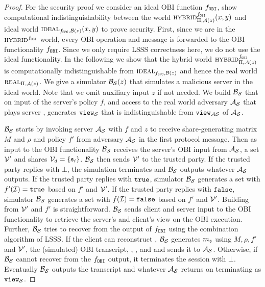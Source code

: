 \begin{proof}
For the security proof we consider an ideal \ac{OBI} function $f_\mathtt{OBI}$, \ie show computational indistinguishability between the world $\HYBRID^{f_\OBI}_{\Pi, \cA(z)} (x, y)$ and ideal world $\IDEAL_{f_\SPC, \cB(z)}(x, y)$ to prove security. 
First, since we are in the $\HYBRID^{f_\OBI}$ world, every \ac{OBI} operation and message is forwarded to the \ac{OBI} functionality $f_\mathtt{OBI}$.
Since we only require \ac{LSSS} correctness here, we do not use the ideal functionality.
In the following we show that the hybrid world $\HYBRID^{f_\OBI}_{\Pi, \cA(z)}$ is computationally indistinguishable from $\IDEAL_{f_\SPC, \cB(z)}$ and hence the real world $\REAL_{\Pi, \cA(z)}$. 
We give a simulator $\mathcal{B}_\mathcal{S}(z)$ that simulates a malicious server in the ideal world. 
Note that we omit auxiliary input $z$ if not needed. 
We build $\mathcal{B}_\mathcal{S}$ that on input of the server's policy $f$, and access to the real world adversary $\mathcal{A}_\mathcal{S}$ that plays server \Server, generates $\mathtt{view}_\mathcal{S}$ that is indistinguishable from $\mathtt{view}_{\mathcal{A}\mathcal{S}}$ of $\mathcal{A}_\mathcal{S}$.

$\mathcal{B}_\mathcal{S}$ starts by invoking server $\mathcal{A}_\mathcal{S}$ with $f$ and $z$ to receive share-generating matrix $M$ and $\rho$ and policy $f'$ from adversary $\mathcal{A}_\mathcal{S}$ in the first protocol message. 
Then as input to the \ac{OBI} functionality $\mathcal{B}_\mathcal{S}$ receives the server's \ac{OBI} input  from $\mathcal{A}_\mathcal{S}$, \ie a set $\mathcal{V}'$ and shares $\mathcal{V}_d=\{\mathfrak{s}_i\}$. 
$\mathcal{B}_\mathcal{S}$ then sends $\mathcal{V}'$ to the trusted party. 
If the trusted party replies with $\bot$, the simulation terminates and $\mathcal{B}_\mathcal{S}$ outputs whatever $\mathcal{A}_\mathcal{S}$ outputs. 
If the trusted party replies with $\mathtt{true}$, 
simulator $\mathcal{B}_\mathcal{S}$ generates a set \ClientSet with $f'(\mathcal{I})=\mathtt{true}$ based on $f'$ and $\mathcal{V}'$. 
If the trusted party replies with $\texttt{false}$, simulator $\mathcal{B}_\mathcal{S}$ generates a set \ClientSet with $f(\mathcal{I})=\texttt{false}$ based on $f'$ and $\mathcal{V}'$. 
Building \ClientSet from $\mathcal{V}'$ and $f'$ is straightforward. 
$\mathcal{B}_\mathcal{S}$ sends client and server input to the \ac{OBI} functionality to retrieve the server's and client's view on the \ac{OBI} execution. 
Further, $\mathcal{B}_\mathcal{S}$ tries to recover \secret from the output of $f_\mathtt{OBI}$ using the combination algorithm of \ac{LSSS}. 
If the client can reconstruct \secret, $\mathcal{B}_\mathcal{S}$ generates $m_\mathfrak{s}$ using $M, \rho, f'$ and $\mathcal{V}'$, the (simulated) \ac{OBI} transcript, \secret, \Client, and \Server and sends it to $\mathcal{A}_\mathcal{S}$. 
Otherwise, if $\mathcal{B}_\mathcal{S}$ cannot recover \secret from the $f_\mathtt{OBI}$ output, it terminates the session with $\bot$.
Eventually $\mathcal{B}_\mathcal{S}$ outputs the transcript and whatever $\mathcal{A}_\mathcal{S}$ returns on terminating as $\mathtt{view}_\mathcal{S}$.


\end{proof}
